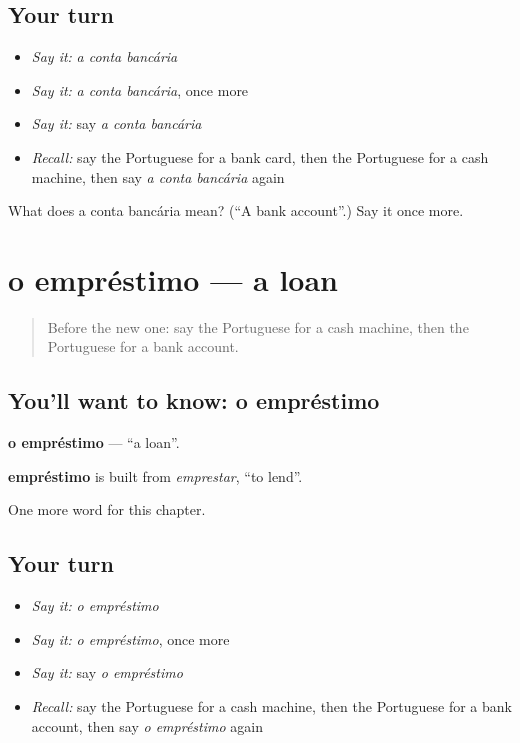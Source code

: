 \subsection*{Your turn}
\begin{itemize}
\raggedright
  \item \emph{Say it:} \emph{a conta bancária}
  \item \emph{Say it:} \emph{a conta bancária}, once more
  \item \emph{Say it:} say \emph{a conta bancária}
  \item \emph{Recall:} say the Portuguese for a bank card, then the Portuguese for a cash machine, then say \emph{a conta bancária} again
\end{itemize}

\begin{tcolorbox}[breakable,colback=teal!4,colframe=teal!35!black,title={Before you move on}]
What does a conta bancária mean? (\textquotedblleft{}A bank account\textquotedblright{}.) Say it once more.
\end{tcolorbox}
\section[o empréstimo]{o empréstimo — a loan}

\label{lesson:PT-C248-emprestimo}



\begin{quote}
Before the new one: say the Portuguese for a cash machine, then the Portuguese for a bank account.
\end{quote}

\subsection*{You'll want to know: o empréstimo}
\textbf{o empréstimo} — \textquotedblleft{}a loan\textquotedblright{}.

\begin{cousinweb}
\textbf{empréstimo} is built from \emph{emprestar}, \textquotedblleft{}to lend\textquotedblright{}.
\end{cousinweb}

\begin{grammarlens}[title={What you've built}]
One more word for this chapter.
\end{grammarlens}

\subsection*{Your turn}
\begin{itemize}
\raggedright
  \item \emph{Say it:} \emph{o empréstimo}
  \item \emph{Say it:} \emph{o empréstimo}, once more
  \item \emph{Say it:} say \emph{o empréstimo}
  \item \emph{Recall:} say the Portuguese for a cash machine, then the Portuguese for a bank account, then say \emph{o empréstimo} again
\end{itemize}

